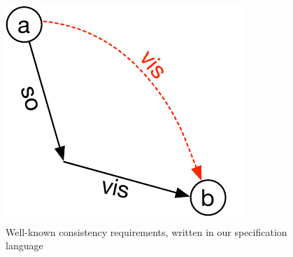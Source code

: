\begin{figure}[h]
\includegraphics[scale=0.6]{../Figures/MR.pdf}
\caption{Well-known consistency requirements, written in our specification language}
\label{fig:ctrt}
\end{figure}

